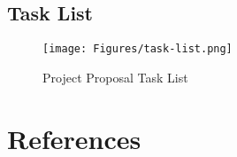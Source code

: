 \documentclass[
	letterpaper, %
]{jdf}
\begin{document}
\subsection{Task List}
\begin{figure}[h]
    \centering
    \texttt{[image: Figures/task-list.png]} %
    \caption{Project Proposal Task List}
    \label{fig:example}
\end{figure}

\section*{References}
\printbibliography[heading=none]
\end{document}
